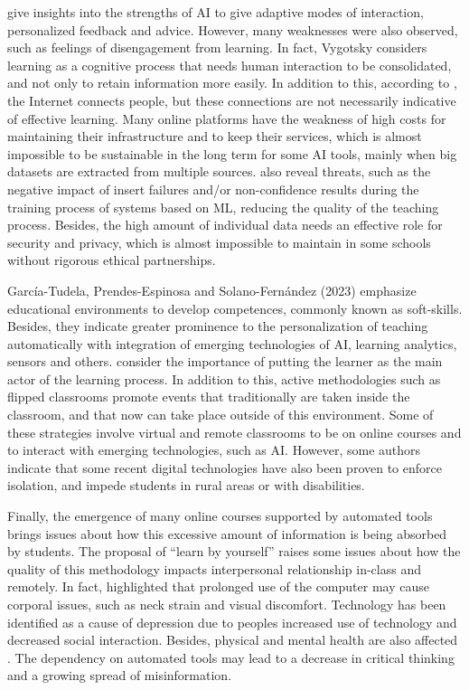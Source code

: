 \documentclass[english]{textolivre}
\begin{document}
\textcite{Dimitriadou2022} give insights into the strengths of AI to
give adaptive modes of interaction, personalized feedback and advice.
However, many weaknesses were also observed, such as feelings of
disengagement from learning. In fact, Vygotsky \cite{ODonnell1999}
considers learning as a cognitive process that needs human interaction
to be consolidated, and not only to retain information more easily. In
addition to this, according to \textcite{Yang2021}, the Internet connects
people, but these connections are not necessarily indicative of
effective learning. Many online platforms have the weakness of high
costs for maintaining their infrastructure and to keep their services,
which is almost impossible to be sustainable in the long term for some
AI tools, mainly when big datasets are extracted from multiple sources.
\textcite{Dimitriadou2022} also reveal threats, such as the negative
impact of insert failures and/or non-confidence results during the
training process of systems based on ML, reducing the quality of the
teaching process. Besides, the high amount of individual data needs an
effective role for security and privacy, which is almost impossible to
maintain in some schools without rigorous ethical partnerships.

García-Tudela, Prendes-Espinosa and Solano-Fernández (2023) emphasize
educational environments to develop competences, commonly known as
soft-skills. Besides, they indicate greater prominence to the
personalization of teaching automatically with integration of emerging
technologies of AI, learning analytics, sensors and others. \textcite{Mustafa2022} consider the importance of putting the learner as the main
actor of the learning process. In addition to this, active methodologies
such as flipped classrooms promote events that traditionally are taken
inside the classroom, and that now can take place outside of this
environment. Some of these strategies involve virtual and remote
classrooms to be on online courses and to interact with emerging
technologies, such as AI. However, some authors \cite{Dimitriadou2022}
indicate that some recent digital technologies have also been proven to
enforce isolation, and impede students in rural areas or with
disabilities.

Finally, the emergence of many online courses supported by automated
tools brings issues about how this excessive amount of information is
being absorbed by students. The proposal of ``learn by yourself'' raises
some issues about how the quality of this methodology impacts
interpersonal relationship in-class and remotely. In fact, \textcite{farahani2018towards} highlighted that prolonged use of the computer may cause
corporal issues, such as neck strain and visual discomfort. Technology
has been identified as a cause of depression due to
people\textquotesingle s increased use of technology and decreased
social interaction. Besides, physical and mental health are also
affected \cite{brohi2023exploring}. The dependency on automated tools may lead
to a decrease in critical thinking and a growing spread of
misinformation.
\end{document}
